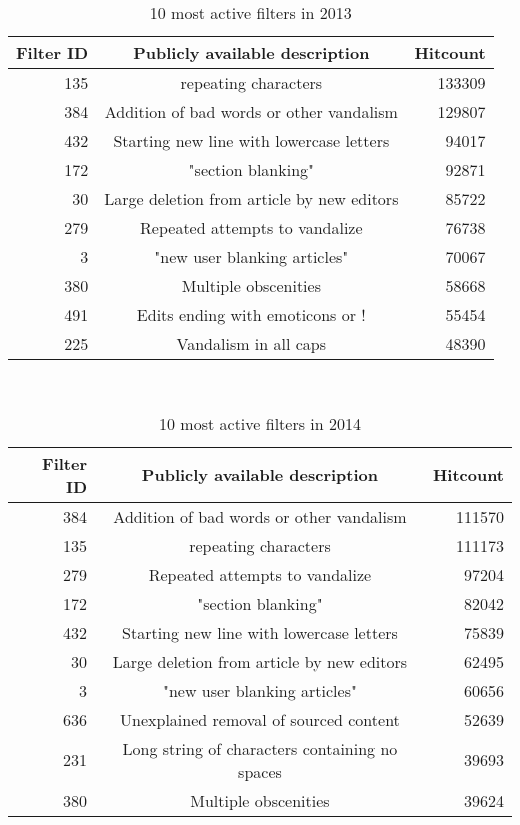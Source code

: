 \begin{table}
  \centering
  \begin{tabular}{r c r }
    Filter ID & Publicly available description & Hitcount \\
    \hline
    135 & repeating characters & 133309 \\
    384 & Addition of bad words or other vandalism & 129807 \\
    432 & Starting new line with lowercase letters & 94017 \\
    172 & "section blanking" & 92871 \\
    30 & Large deletion from article by new editors & 85722 \\
    279 & Repeated attempts to vandalize & 76738 \\
    3 & "new user blanking articles" & 70067 \\
    380 & Multiple obscenities & 58668 \\
    491 & Edits ending with emoticons or ! & 55454 \\
    225 & Vandalism in all caps & 48390 \\
  \end{tabular}
  \caption{10 most active filters in 2013}~\label{tab:app-most-active-2013}
\end{table}

\begin{table}
  \centering
  \begin{tabular}{r c r }
    Filter ID & Publicly available description & Hitcount \\
    \hline
    384 & Addition of bad words or other vandalism & 111570 \\
    135 & repeating characters & 111173 \\
    279 & Repeated attempts to vandalize & 97204 \\
    172 & "section blanking" & 82042 \\
    432 & Starting new line with lowercase letters & 75839 \\
    30  & Large deletion from article by new editors & 62495 \\
    3 & "new user blanking articles" & 60656 \\
    636 & Unexplained removal of sourced content & 52639 \\
    231 & Long string of characters containing no spaces & 39693 \\
    380 & Multiple obscenities & 39624 \\
  \end{tabular}
  \caption{10 most active filters in 2014}~\label{tab:app-most-active-2014}
\end{table}


